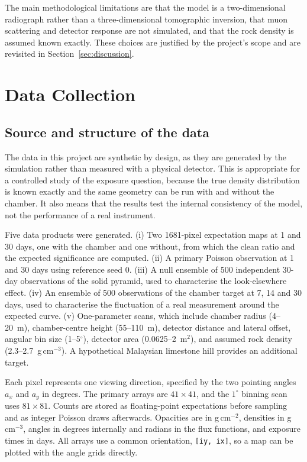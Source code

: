 \documentclass{article}
\begin{document}
The main methodological limitations are that the model is a two-dimensional
radiograph rather than a three-dimensional tomographic inversion, that muon
scattering and detector response are not simulated, and that the rock density
is assumed known exactly. These choices are justified by the project's scope
and are revisited in Section~\ref{sec:discussion}.


\section{Data Collection}
\label{sec:data}

\subsection{Source and structure of the data}

The data in this project are synthetic by design, as they are generated by the
simulation rather than measured with a physical detector. This is appropriate
for a controlled study of the exposure question, because the true density
distribution is known exactly and the same geometry can be run with and without
the chamber. It also means that the results test the internal consistency of
the model, not the performance of a real instrument.

Five data products were generated. (i) Two 1681-pixel expectation maps at 1 and
30 days, one with the chamber and one without, from which the clean ratio and
the expected significance are computed. (ii) A primary Poisson observation at 1
and 30 days using reference seed 0. (iii) A null ensemble of 500 independent
30-day observations of the solid pyramid, used to characterise the
look-elsewhere effect. (iv) An ensemble of 500 observations of the chamber
target at 7, 14 and 30 days, used to characterise the fluctuation of a real
measurement around the expected curve. (v) One-parameter scans, which include chamber radius
(4--20~m), chamber-centre height (55--110~m), detector distance and lateral offset,
angular bin size (1--5$^\circ$), detector area (0.0625--2~m$^2$), and assumed
rock density (2.3--2.7~g\,cm$^{-3}$). A hypothetical Malaysian limestone hill
provides an additional target.

Each pixel represents one viewing direction, specified by the two pointing
angles $a_x$ and $a_y$ in degrees. The primary arrays are
$41\times41$, and the $1^\circ$ binning scan uses $81\times81$. Counts are stored
as floating-point expectations before sampling and as integer Poisson draws
afterwards. Opacities are in g\,cm$^{-2}$, densities in g\,cm$^{-3}$, angles in
degrees internally and radians in the flux functions, and exposure times in
days. All arrays use a common orientation, \texttt{[iy, ix]}, so a map can be
plotted with the angle grids directly.
\end{document}
